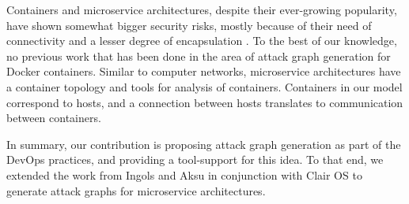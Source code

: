 Containers and microservice architectures, despite their ever-growing popularity, have shown somewhat bigger security risks, mostly because of their  need of connectivity and a lesser degree of encapsulation \cite{combe2016docker, dragoni2017microservices}. To the best of our knowledge, no previous work that has been done  in the area of attack graph generation for Docker containers. Similar to computer networks, microservice architectures have a container topology and tools for analysis of containers. Containers in our model correspond to hosts, and a connection between hosts translates to communication between containers. 

In summary, our contribution is proposing attack graph generation as part of the DevOps practices, and providing a tool-support for this idea. To that end, we extended the work from Ingols \cite{ingols2006practical} and Aksu \cite{aksu2018automated} in conjunction with Clair OS to generate attack graphs for microservice architectures. 


